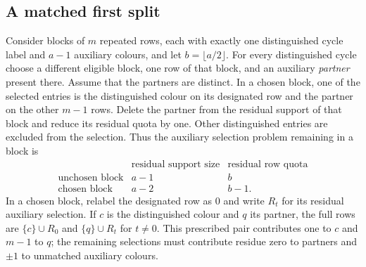 \documentclass[11pt,reqno]{amsart}
\numberwithin{equation}{section}
\theoremstyle{definition}
\theoremstyle{remark}
\begin{document}
\subsection{A matched first split}
Consider blocks of $m$ repeated rows, each with exactly one distinguished cycle label
and $a-1$ auxiliary colours, and let $b=\lfloor a/2\rfloor$. For every distinguished
cycle choose a different eligible block, one row of that block, and an auxiliary
\emph{partner} present there. Assume that the partners are distinct. In a chosen block, one of the selected entries is the distinguished colour
on its designated row and the partner on the other $m-1$ rows. Delete the partner from the residual support of that
block and reduce its residual quota by one. Other distinguished entries are excluded from the selection.
Thus the auxiliary selection problem remaining in a block is
\[
\begin{array}{c|cc}
 &\text{residual support size}&\text{residual row quota}\\\hline
 \text{unchosen block}&a-1&b\\
 \text{chosen block}&a-2&b-1.
\end{array}
\]
In a chosen block, relabel the designated row as $0$ and write $R_t$ for its
residual auxiliary selection. If $c$ is the distinguished colour and $q$
its partner, the full rows are $\{c\}\cup R_0$ and $\{q\}\cup R_t$ for $t\ne0$.
This prescribed pair contributes one to $c$ and $m-1$ to $q$; the
remaining selections must contribute residue zero to partners and
$\pm1$ to unmatched auxiliary colours.
\end{document}

